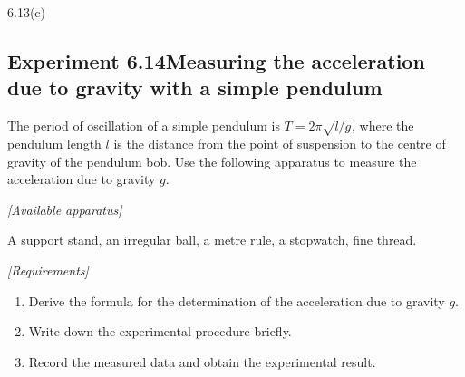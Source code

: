 \begin{figbox}{6.13(c)}
\end{figbox}

\subsection*{Experiment 6.14\quad Measuring the acceleration due to gravity with a simple pendulum}

The period of oscillation of a simple pendulum is $T=2\pi\sqrt{l/g}$, where the pendulum length $l$ is the distance from the point of suspension to the centre of gravity of the pendulum bob. Use the following apparatus to measure the acceleration due to gravity $g$.

\noindent\textit{[Available apparatus]}

A support stand, an irregular ball, a metre rule, a stopwatch, fine thread.

\noindent\textit{[Requirements]}
\begin{enumerate}[label=(\arabic*),leftmargin=2.2em,itemsep=1pt,topsep=2pt]
\item Derive the formula for the determination of the acceleration due to gravity $g$.
\item Write down the experimental procedure briefly.
\item Record the measured data and obtain the experimental result.
\end{enumerate}

